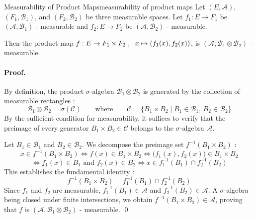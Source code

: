 
\begin{lemma}{Measurability of Product Maps}{measurability of product maps}
Let $(E, \mathcal{A})$, $(F_1, \mathcal{B}_1)$, and $(F_2, \mathcal{B}_2)$ be three measurable spaces.
Let $f_1 : E \to F_1$ be $(\mathcal{A}, \mathcal{B}_1)$ - measurable and $f_2 : E \to F_2$ be $(\mathcal{A}, \mathcal{B}_2)$ - measurable.

Then the product map $f : E \to F_1 \times F_2 \hspace{0.3em}, \hspace{0.6em} x \mapsto (f_1(x), f_2(x))$, is $(\mathcal{A}, \mathcal{B}_1 \otimes \mathcal{B}_2)$ - measurable.
\end{lemma}

\paragraph{Proof.}
By definition, the product $\sigma$-algebra $\mathcal{B}_1 \otimes \mathcal{B}_2$ is generated by the collection of measurable rectangles :
\[
    \mathcal{B}_1 \otimes \mathcal{B}_2 = \sigma(\mathcal{C}) \qquad \text{where} \qquad \mathcal{C} = \{ B_1 \times B_2 \mid B_1 \in \mathcal{B}_1,\, B_2 \in \mathcal{B}_2 \}
\]
By the sufficient condition for measurability, it suffices to verify that the preimage of every generator $B_1 \times B_2 \in \mathcal{C}$ belongs to the $\sigma$-algebra $\mathcal{A}$.

Let $B_1 \in \mathcal{B}_1$ and $B_2 \in \mathcal{B}_2$. We decompose the preimage set $f^{-1}(B_1 \times B_2)$ :
\[
    x \in f^{-1}(B_1 \times B_2) \iff f(x) \in B_1 \times B_2 \iff \big(f_1(x), f_2(x)\big) \in B_1 \times B_2
\]
\[
    \iff f_1(x) \in B_1 \text{ and } f_2(x) \in B_2 \iff x \in f_1^{-1}(B_1) \cap f_2^{-1}(B_2)
\]
This establishes the fundamental identity :
\[
    f^{-1}(B_1 \times B_2) = f_1^{-1}(B_1) \cap f_2^{-1}(B_2)
\]
Since $f_1$ and $f_2$ are measurable, $f_1^{-1}(B_1) \in \mathcal{A}$ and $f_2^{-1}(B_2) \in \mathcal{A}$. A $\sigma$-algebra being closed under finite intersections, we obtain $f^{-1}(B_1 \times B_2) \in \mathcal{A}$, proving that $f$ is $(\mathcal{A}, \mathcal{B}_1 \otimes \mathcal{B}_2)$ - measurable. \qed

\vspace{1.2em}


